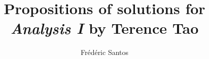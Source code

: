 \documentclass[11pt]{article}
\title{Propositions of solutions for \textit{Analysis I} by Terence Tao}
\author{Frédéric Santos}
\newenvironment{exo}[2]{\textsc{Exercise #1}. --- #2 \hfill $\square$}
\begin{document}
\maketitle

\section{Introduction}
\label{sec:introduction}
No exercises in this chapter.

\section{The natural numbers}
\label{sec:natural-numbers}
\begin{exo}{2.2.1}{
    Solution.
}
\end{exo}
\end{document}
